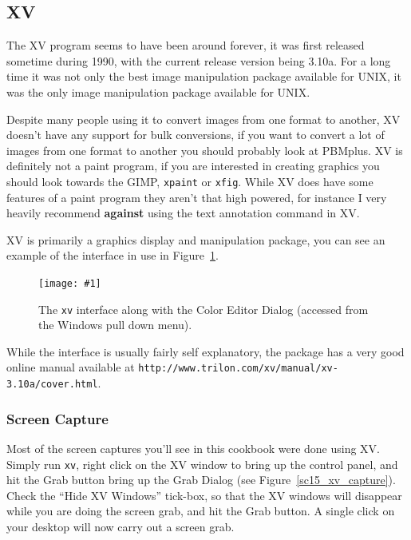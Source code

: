 \documentclass[twoside,11pt]{article}
\newcommand{\htmladdnormallink}[2]{#1}
\newcommand{\htmladdimg}[1]{}
\newcommand{\htmlref}[2]{#1}
\newcommand{\latex}[1]{#1}
\newcommand{\xlabel}[1]{}
\newcommand{\myfig} [5] {
  \begin{figure}
    \centering\texttt{[image: \#1]}
    \typeout{#1 inserted on page \arabic{page}}
    \caption{\label{#4}#5}
  \end{figure}
  }
\newcommand{\myfig}[5]{
    \label{#4} \htmladdimg{#3}\\
    Figure: #5\\
    }
\begin{document}

\subsection{\xlabel{sc15_xv}XV\label{sc15_xv}}

The \htmladdnormallink{XV}{http://www.trilon.com/xv/} program seems to have been around forever, it was first released sometime during 1990, with the current release version being 3.10a. For a long time it was not only the best image manipulation package available for UNIX, it was the only image manipulation package available for UNIX. 

Despite many people using it to convert images from one format to another, XV doesn't have any support for bulk conversions, if you want to convert a lot of images from one format to another you should probably look at \htmlref{PBMplus}{sc15_pbmplus}. XV is definitely not a paint program, if you are interested in creating graphics you should look towards the \htmlref{GIMP}{sc15_gimp}, \htmlref{{\tt xpaint}}{sc15_xpaint} or \htmlref{{\tt xfig}}{sc15_xfig}. While XV does have some features of a paint program they aren't that high powered, for instance I very heavily recommend {\bf against} using the text annotation command in XV.

XV is primarily a graphics display and manipulation package, you can see an example of the interface in use in Figure~\ref{sc15_xv_interface}.

\myfig{sc15_xv.eps}{height=0.8\textheight}{sc15_xv.gif}{sc15_xv_interface}{The {\tt xv} interface along with the Color Editor Dialog (accessed from the Windows pull down menu).} 

While the interface is usually fairly self explanatory, the package has a very good online \htmladdnormallink{manual}{http://www.trilon.com/xv/manual/xv-3.10a/cover.html}\latex{ available at {\tt http://www.trilon.com/xv/manual/xv-3.10a/cover.html}}.

\subsubsection{Screen Capture}

Most of the screen captures you'll see in this cookbook were done using XV. Simply run {\tt xv}, right click on the XV window to bring up the control panel, and hit the {\sc Grab} button bring up the Grab Dialog (see Figure~\ref{sc15_xv_capture}). Check the ``Hide XV Windows'' tick-box, so that the XV windows will disappear while you are doing the screen grab, and hit the {\sc Grab} button. A single click on your desktop will now carry out a screen grab.
\end{document}
